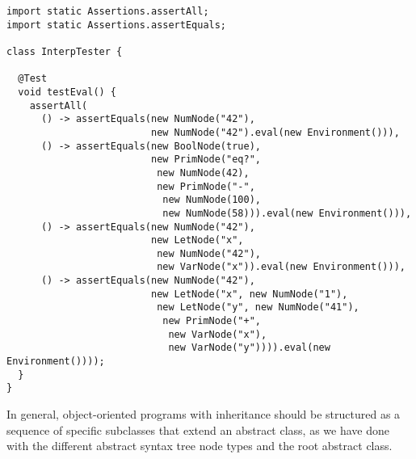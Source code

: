 \begin{lstlisting}[language=MyJava]
import static Assertions.assertAll;
import static Assertions.assertEquals;
  
class InterpTester {
  
  @Test
  void testEval() {
    assertAll(
      () -> assertEquals(new NumNode("42"),
                         new NumNode("42").eval(new Environment())),
      () -> assertEquals(new BoolNode(true),
                         new PrimNode("eq?",
                          new NumNode(42),
                          new PrimNode("-",
                           new NumNode(100),
                           new NumNode(58))).eval(new Environment())),
      () -> assertEquals(new NumNode("42"),
                         new LetNode("x", 
                          new NumNode("42"), 
                          new VarNode("x")).eval(new Environment())),
      () -> assertEquals(new NumNode("42"),
                         new LetNode("x", new NumNode("1"),
                          new LetNode("y", new NumNode("41"),
                           new PrimNode("+", 
                            new VarNode("x"), 
                            new VarNode("y")))).eval(new Environment())));
  }
}
\end{lstlisting}

In general, object-oriented programs with inheritance should be structured as a sequence of specific subclasses that extend an abstract class, as we have done with the different abstract syntax tree node types and the root  abstract class. 

